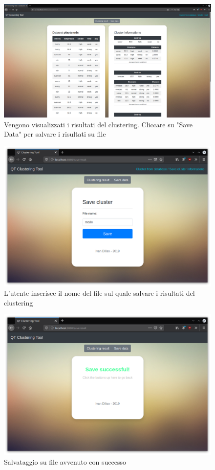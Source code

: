 \documentclass{article}
\begin{document}
    \begin{figure}[H]
        \includegraphics[scale=0.3]{ADDON3}
        \caption{Vengono visualizzati i risultati del clustering. Cliccare su 
        "Save Data" per salvare i risultati su file}   
        \label{fig:7}
    \end{figure} 
    \begin{figure}[H]
        \includegraphics[scale=0.4]{ADDON4}
        \caption{L'utente inserisce il nome del file sul quale salvare i 
        risultati del clustering}   
        \label{fig:8}
    \end{figure} 
    \begin{figure}[H]
        \includegraphics[scale=0.4]{ADDON5}
        \caption{Salvataggio su file avvenuto con successo}   
        \label{fig:9}
    \end{figure} 
\end{document}
